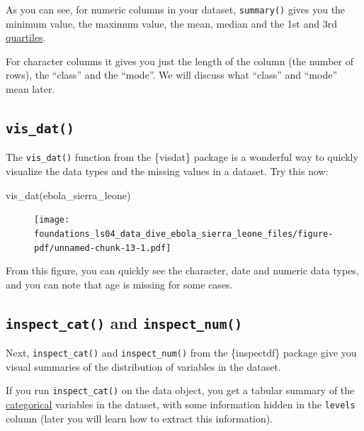 \documentclass[
  letterpaper,
  DIV=11,
  numbers=noendperiod]{scrreprt}
\newenvironment{Shaded}{\begin{snugshade}}{\end{snugshade}}
\newcommand{\FunctionTok}[1]{\textcolor[rgb]{0.28,0.35,0.67}{#1}}
\newcommand{\NormalTok}[1]{\textcolor[rgb]{0.00,0.23,0.31}{#1}}
\begin{document}
As you can see, for numeric columns in your dataset, \texttt{summary()}
gives you the minimum value, the maximum value, the mean, median and the
1st and 3rd
\href{https://www.mathsisfun.com/data/quartiles.html}{quartiles}.

For character columns it gives you just the length of the column (the
number of rows), the ``class'' and the ``mode''. We will discuss what
``class'' and ``mode'' mean later.

\hypertarget{vis_dat}{%
\subsection{\texorpdfstring{\texttt{vis\_dat()}}{vis\_dat()}}\label{vis_dat}}

The \texttt{vis\_dat()} function from the \{visdat\} package is a
wonderful way to quickly visualize the data types and the missing values
in a dataset. Try this now:

\begin{Shaded}
\begin{Highlighting}[]
\FunctionTok{vis\_dat}\NormalTok{(ebola\_sierra\_leone)}
\end{Highlighting}
\end{Shaded}

\begin{figure}[H]

{\centering \texttt{[image: foundations\_ls04\_data\_dive\_ebola\_sierra\_leone\_files/figure-pdf/unnamed-chunk-13-1.pdf]}

}

\end{figure}

From this figure, you can quickly see the character, date and numeric
data types, and you can note that age is missing for some cases.

\hypertarget{inspect_cat-and-inspect_num}{%
\subsection{\texorpdfstring{\texttt{inspect\_cat()} and
\texttt{inspect\_num()}}{inspect\_cat() and inspect\_num()}}\label{inspect_cat-and-inspect_num}}

Next, \texttt{inspect\_cat()} and \texttt{inspect\_num()} from the
\{inspectdf\} package give you visual summaries of the distribution of
variables in the dataset.

If you run \texttt{inspect\_cat()} on the data object, you get a tabular
summary of the
\href{https://psyteachr.github.io/glossary/c.html?q=categor\#categorical}{categorical}
variables in the dataset, with some information hidden in the
\texttt{levels} column (later you will learn how to extract this
information).
\end{document}
